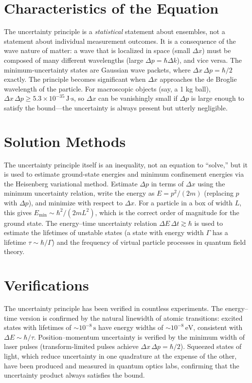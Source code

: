 \section*{Characteristics of the Equation}

The uncertainty principle is a \emph{statistical} statement about ensembles, not a statement about individual measurement outcomes. It is a consequence of the wave nature of matter: a wave that is localized in space (small $\Delta x$) must be composed of many different wavelengths (large $\Delta p = \hbar\Delta k$), and vice versa. The minimum-uncertainty states are Gaussian wave packets, where $\Delta x\,\Delta p = \hbar/2$ exactly. The principle becomes significant when $\Delta x$ approaches the de Broglie wavelength of the particle. For macroscopic objects (say, a 1 kg ball), $\Delta x\,\Delta p \geq 5.3\times 10^{-35}\,\text{J·s}$, so $\Delta x$ can be vanishingly small if $\Delta p$ is large enough to satisfy the bound---the uncertainty is always present but utterly negligible.
\section*{Solution Methods}

The uncertainty principle itself is an inequality, not an equation to ``solve,'' but it is used to estimate ground-state energies and minimum confinement energies via the Heisenberg variational method. Estimate $\Delta p$ in terms of $\Delta x$ using the minimum uncertainty relation, write the energy as $E = p^2/(2m)$ (replacing $p$ with $\Delta p$), and minimize with respect to $\Delta x$. For a particle in a box of width $L$, this gives $E_{\text{min}} \sim \hbar^2/(2mL^2)$, which is the correct order of magnitude for the ground state. The energy--time uncertainty relation $\Delta E\,\Delta t \gtrsim \hbar$ is used to estimate the lifetimes of unstable states (a state with energy width $\Gamma$ has a lifetime $\tau \sim \hbar/\Gamma$) and the frequency of virtual particle processes in quantum field theory.
\section*{Verifications}

The uncertainty principle has been verified in countless experiments. The energy--time version is confirmed by the natural linewidth of atomic transitions: excited states with lifetimes of $\sim 10^{-8}\,\text{s}$ have energy widths of $\sim 10^{-8}\,\text{eV}$, consistent with $\Delta E \sim \hbar/\tau$. Position--momentum uncertainty is verified by the minimum width of laser pulses (transform-limited pulses achieve $\Delta x\,\Delta p = \hbar/2$). Squeezed states of light, which reduce uncertainty in one quadrature at the expense of the other, have been produced and measured in quantum optics labs, confirming that the uncertainty product always satisfies the bound.
